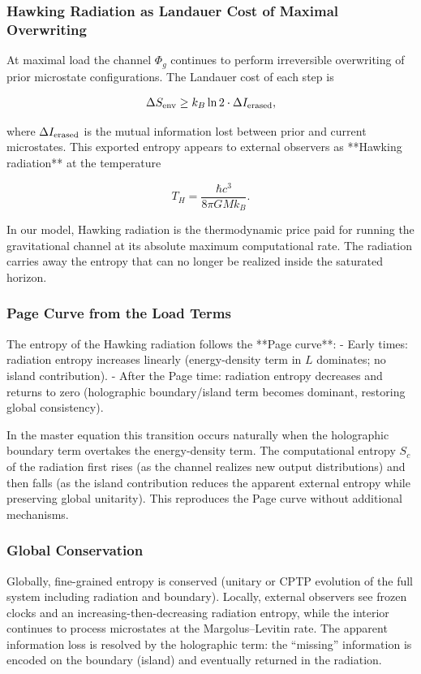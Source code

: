 \documentclass[reprint,amsmath,amssymb,aps,prd,preprintnumbers,superscriptaddress,longbibliography,10pt]{revtex4-2}
\begin{document}
\subsubsection{Hawking Radiation as Landauer Cost of Maximal Overwriting}

At maximal load the channel \(\Phi_g\) continues to perform irreversible overwriting of prior microstate configurations. The Landauer cost of each step is

\[
\Delta S_{\rm env} \geq k_B \ln 2 \cdot \Delta I_{\rm erased},
\]

where \(\Delta I_{\rm erased}\) is the mutual information lost between prior and current microstates. This exported entropy appears to external observers as **Hawking radiation** at the temperature

\[
T_H = \frac{\hbar c^3}{8\pi G M k_B}.
\]

In our model, Hawking radiation is the thermodynamic price paid for running the gravitational channel at its absolute maximum computational rate. The radiation carries away the entropy that can no longer be realized inside the saturated horizon.

\subsubsection{Page Curve from the Load Terms}

The entropy of the Hawking radiation follows the **Page curve**:
- Early times: radiation entropy increases linearly (energy-density term in \(L\) dominates; no island contribution).
- After the Page time: radiation entropy decreases and returns to zero (holographic boundary/island term becomes dominant, restoring global consistency).

In the master equation this transition occurs naturally when the holographic boundary term overtakes the energy-density term. The computational entropy \(S_c\) of the radiation first rises (as the channel realizes new output distributions) and then falls (as the island contribution reduces the apparent external entropy while preserving global unitarity). This reproduces the Page curve without additional mechanisms.

\subsubsection{Global Conservation}

Globally, fine-grained entropy is conserved (unitary or CPTP evolution of the full system including radiation and boundary). Locally, external observers see frozen clocks and an increasing-then-decreasing radiation entropy, while the interior continues to process microstates at the Margolus–Levitin rate. The apparent information loss is resolved by the holographic term: the “missing” information is encoded on the boundary (island) and eventually returned in the radiation.
\end{document}
